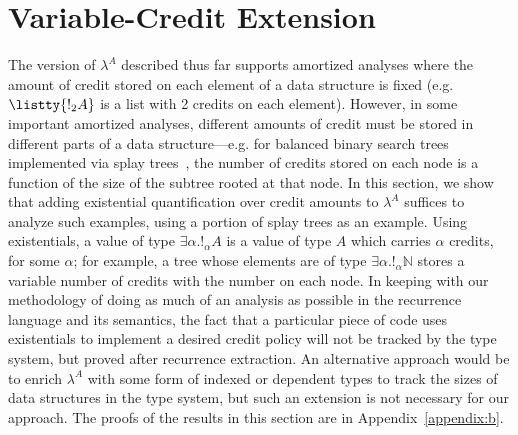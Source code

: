 \section{Variable-Credit Extension}
\label{sec:ex}

The version of $\lambda^A$ described thus far supports amortized analyses
where the amount of credit stored on each element of a data structure is
fixed (e.g. $\listty{!_2 A}$ is a list with 2 credits on each element).
However, in some important amortized analyses, different amounts of credit
must be stored in different parts of a data structure---e.g. for balanced
binary search trees implemented via splay trees~\cite{sleator-tarjan-85},
the number of credits stored on each node is a function of the size of the
subtree rooted at that node.  In this section, we show that adding
existential quantification over credit amounts to $\lambda^A$ suffices to
analyze such examples, using a portion of splay trees as an example.  Using
existentials, a value of type $\exists \alpha.!_\alpha A$ is a value of type
$A$ which carries $\alpha$ credits, for some $\alpha$; for example, a tree
whose elements are of type $\exists \alpha.!_\alpha \mathbb{N}$ stores a
variable number of credits with the number on each node. In keeping with our
methodology of doing as much of an analysis as possible in the recurrence
language and its semantics, the fact that a particular piece of code uses
existentials to implement a desired credit policy will not be tracked by the
type system, but proved after recurrence extraction.  An alternative
approach would be to enrich $\lambda^A$ with some form of indexed or
dependent types to track the sizes of data structures in the type system,
but such an extension is not necessary for our approach.  
The proofs of the results in this section
are in Appendix~\ref{appendix:b}.%


